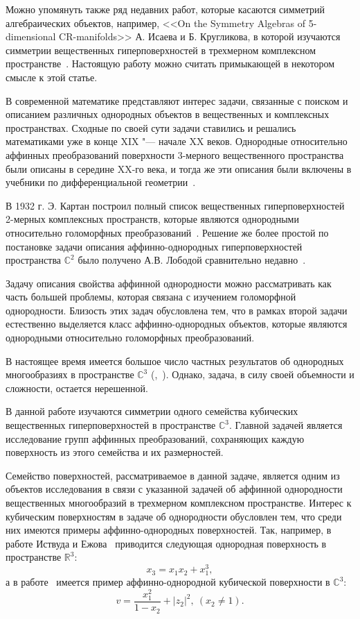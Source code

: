 \documentclass[../main.tex]{subfiles}
\begin{document}
Можно упомянуть также ряд недавних работ, которые касаются симметрий алгебраических объектов, например, <<On the Symmetry Algebras of 5-dimensional CR-manifolds>> А. Исаева и Б. Кругликова, в которой изучаются симметрии вещественных гиперповерхностей в трехмерном комплексном пространстве~\cite{IK}. Настоящую работу можно считать примыкающей в некотором смысле к этой статье.

В современной математике представляют интерес задачи, связанные с поиском и описанием различных однородных объектов в вещественных и комплексных пространствах. Сходные по своей сути задачи ставились и решались математиками уже в конце XIX "--- начале XX веков. Однородные относительно аффинных преобразований поверхности 3-мерного вещественного пространства были описаны в середине XX-го века, и тогда же эти описания были включены в учебники по дифференциальной геометрии~\cite{shirokov}.

В 1932 г. Э. Картан построил полный список вещественных гиперповерхностей 2-мерных комплексных пространств, которые являются однородными относительно голоморфных преобразований~\cite{cartan}. Решение же более простой по постановке задачи описания аффинно-однородных гиперповерхностей пространства $\mathbb{C}^2$ было получено А.В. Лободой сравнительно недавно~\cite{loboda_book}.

Задачу описания свойства аффинной однородности можно рассматривать как часть большей проблемы, которая связана с изучением голоморфной однородности. Близость этих задач обусловлена тем, что в рамках второй задачи естественно выделяется класс аффинно-однородных объектов, которые являются однородными относительно голоморфных преобразований.

В настоящее время имеется большое число частных результатов об однородных многообразиях в пространстве $\mathbb{C}^3$ (\cite{ALS},~\cite{loboda_hodarev}). Однако, задача, в силу своей объемности и сложности, остается нерешенной.


В данной работе изучаются симметрии одного семейства кубических вещественных гиперповерхностей в пространстве $\mathbb{C}^3$. Главной задачей является исследование групп аффинных преобразований, сохраняющих каждую поверхность из этого семейства и их размерностей.

Семейство поверхностей, рассматриваемое в данной задаче, является одним из объектов исследования в связи с указанной задачей об аффинной однородности вещественных многообразий в трехмерном комплексном пространстве. Интерес к кубическим поверхностям в задаче об однородности обусловлен тем, что среди них имеются примеры аффинно-однородных поверхностей. Так, например, в работе Иствуда и Ежова~\cite{eastwood} приводится следующая однородная поверхность в пространстве $\mathbb{R}^3$:
$$
x_3 = x_1 x_2 + x_1^3,
$$
а в работе~\cite{ALS} имеется пример аффинно-однородной кубической поверхности в $\mathbb{C}^3$:
$$
v = \frac{x_1^2}{1 - x_2} + |z_2|^2,\ (x_2 \ne 1).
$$
\end{document}
